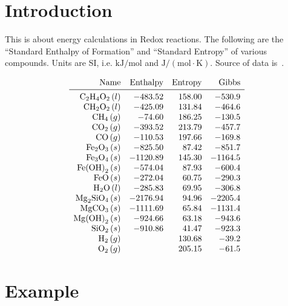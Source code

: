\documentclass[a4paper,14pt]{extarticle}
\def\H{{\rm H}}
\def\O{{\rm O}}
\def\C{{\rm C}}
\def\Fe{{\rm Fe}}
\def\Mg{{\rm Mg}}
\def\Si{{\rm Si}}
\begin{document}

\section{Introduction}

This is about energy calculations in Redox reactions.
The following are the ``Standard Enthalpy of Formation'' and ``Standard Entropy'' of
various compounds. Units are SI, i.e. $\text{kJ}/\text{mol}$ and $\text{J}/(\text{mol}\cdot \text{K})$.
Source of data is~\cite{nist}.

\[
\begin{array}{rrrr}
    \text{Name}      & \text{Enthalpy} & \text{Entropy} & \text{Gibbs} \\
   \midrule
    \C_2\H_4\O_2 \,(l)  &  -483.52 & 158.00  &  -530.9 \\
    \C\H_2\O_2 \,(l)    &  -425.09 & 131.84  &  -464.6 \\
    \C\H_4 \,(g)        &   -74.60 & 186.25  &  -130.5 \\
    \C\O_2 \,(g)        &  -393.52 & 213.79  &  -457.7 \\
    \C\O \,(g)          &  -110.53 & 197.66  &  -169.8 \\
    \Fe_2\O_3 \,(s)     &  -825.50 &  87.42  &  -851.7 \\
    \Fe_3\O_4 \,(s)     & -1120.89 & 145.30  & -1164.5 \\
    \Fe{(\O\H)}_2 \,(s) &  -574.04 &  87.93  &  -600.4 \\
    \Fe\O \,(s)         &  -272.04 &  60.75  &  -290.3 \\
    \H_2\O \,(l)        &  -285.83 &  69.95  &  -306.8 \\
    \Mg_2\Si\O_4 \,(s)  & -2176.94 &  94.96  & -2205.4 \\
    \Mg\C\O_3 \,(s)     & -1111.69 &  65.84  & -1131.4 \\
    \Mg{(\O\H)}_2 \,(s) &  -924.66 &  63.18  &  -943.6 \\
    \Si\O_2 \,(s)       &  -910.86 &  41.47  &  -923.3 \\
    \H_2 \,(g)          &          & 130.68  &   -39.2 \\
    \O_2 \,(g)          &          & 205.15  &   -61.5
\end{array}
\]

\section{Example}
\end{document}
